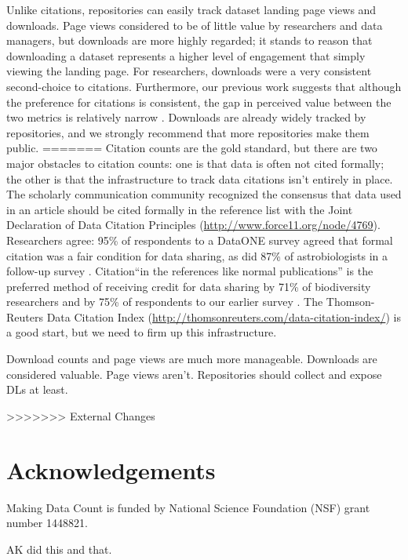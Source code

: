 \documentclass[english]{article}
\begin{document}
Unlike citations, repositories can easily track dataset landing page views and downloads.
Page views considered to be of little value by researchers and data managers, but downloads are more highly regarded; it stands to reason that downloading a dataset represents a higher level of engagement that simply viewing the landing page.
For researchers, downloads were a very consistent second-choice to citations.
Furthermore, our previous work suggests that although the preference for citations is consistent, the gap in perceived value between the two metrics is relatively narrow \cite{kratz_researcher_2015}.
Downloads are already widely tracked by repositories, and we strongly recommend that more repositories make them public.
=======
Citation counts are the gold standard, but there are two major obstacles to citation counts: one is that data is often not cited formally; the other is that the infrastructure to track data citations isn't entirely in place.
The scholarly communication community recognized the consensus that data used in an article should be cited formally in the reference list with the Joint Declaration of Data Citation Principles (\url{http://www.force11.org/node/4769}). 
Researchers agree: 95\% of respondents to a DataONE survey agreed that formal citation was a fair condition for data sharing, as did 87\% of astrobiologists in a follow-up survey \cite{@tenopir_data_2011, @aydinoglu_data_2014}. 
Citation``in the references like normal publications'' is the preferred method of receiving credit for data sharing by 71\% of biodiversity researchers and by 75\% of respondents to our earlier survey \cite{@enke_users_2012, @kratz_researcher_2015}.
The Thomson-Reuters Data Citation Index (\url{http://thomsonreuters.com/data-citation-index/}) is a good start, but we need to firm up this infrastructure.

Download counts and page views are much more manageable.
Downloads are considered valuable.
Page views aren't.
Repositories should collect and expose DLs at least.

>>>>>>> External Changes


\section*{Acknowledgements}

Making Data Count is funded by National Science Foundation (NSF) grant number 1448821.

AK did this and that. 
\end{document}
